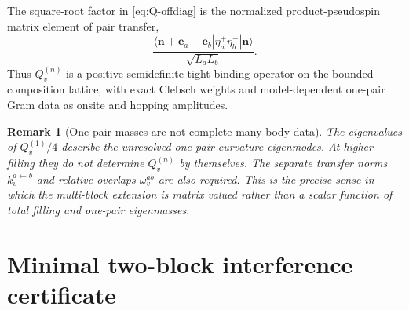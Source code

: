 \documentclass[11pt]{article}
\numberwithin{equation}{section}
\newtheorem{remark}[theorem]{Remark}
\newcommand{\bn}{\mathbf n}
\newcommand{\be}{\mathbf e}
\begin{document}
The square-root factor in \eqref{eq:Q-offdiag} is the normalized product-pseudospin matrix element of pair transfer,
\begin{equation}
 \frac{
 \langle\bn+\be_a-\be_b|
 \eta_a^+\eta_b^-|\bn\rangle
 }{\sqrt{L_aL_b}}.
 \label{eq:eta-transfer-matrix}
\end{equation}
Thus $Q_v^{(n)}$ is a positive semidefinite tight-binding operator on the bounded composition lattice, with exact Clebsch weights and model-dependent one-pair Gram data as onsite and hopping amplitudes.

\begin{remark}[One-pair masses are not complete many-body data]
The eigenvalues of $Q_v^{(1)}/4$ describe the unresolved one-pair curvature eigenmodes.  At higher filling they do not determine $Q_v^{(n)}$ by themselves.  The separate transfer norms $k_v^{a\leftarrow b}$ and relative overlaps $\omega_v^{ab}$ are also required.  This is the precise sense in which the multi-block extension is matrix valued rather than a scalar function of total filling and one-pair eigenmasses.
\end{remark}

\section{Minimal two-block interference certificate}
\end{document}

